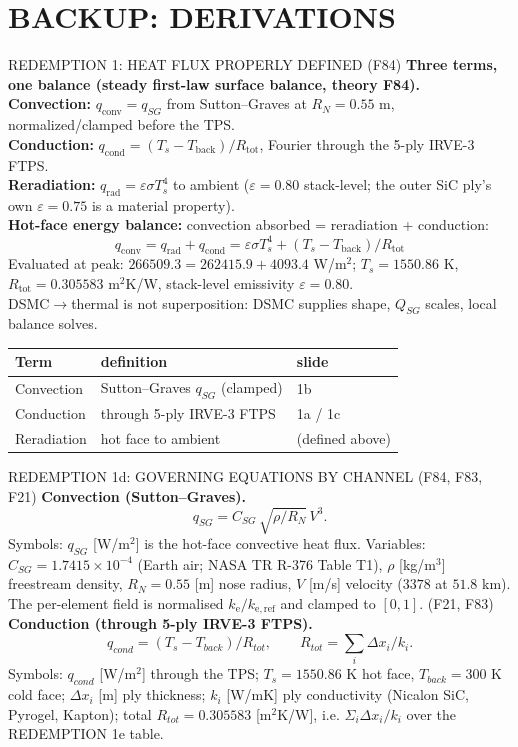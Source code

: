 \documentclass[aspectratio=169,11pt]{beamer}
\begin{document}
\section{BACKUP: DERIVATIONS}
\begin{frame}{REDEMPTION 1: HEAT FLUX PROPERLY DEFINED (F84)}
  \small
  \textbf{Three terms, one balance (steady first-law surface balance, theory F84).}\\
  \textbf{Convection:} $q_{\mathrm{conv}}=q_{SG}$ from Sutton--Graves at $R_N=0.55$ m,
  normalized/clamped before the TPS.\\
  \textbf{Conduction:} $q_{\mathrm{cond}}=(T_s-T_{\mathrm{back}})/R_{\mathrm{tot}}$,
  Fourier through the 5-ply IRVE-3 FTPS.\\
  \textbf{Reradiation:} $q_{\mathrm{rad}}=\varepsilon\sigma T_s^4$ to ambient
  ($\varepsilon=0.80$ stack-level; the outer SiC ply's own $\varepsilon=0.75$
  is a material property).\\
  \textbf{Hot-face energy balance:} convection absorbed = reradiation + conduction:
  \[
  q_{\mathrm{conv}} = q_{\mathrm{rad}} + q_{\mathrm{cond}}
  = \varepsilon\sigma T_s^4 + (T_s - T_{\mathrm{back}})/R_{\mathrm{tot}}
  \]
  Evaluated at peak: $266509.3 = 262415.9 + 4093.4$ W/m$^2$;
  $T_s=1550.86$ K, $R_{\mathrm{tot}}=0.305583$ m$^2$K/W,
  stack-level emissivity $\varepsilon=0.80$.\\
  DSMC$\rightarrow$thermal is not superposition: DSMC supplies shape, $Q_{SG}$ scales, local balance solves.\\
  \begin{tabular}{@{}lll@{}}
  \textbf{Term} & \textbf{definition} & \textbf{slide}\\
  \hline
  Convection & Sutton--Graves $q_{SG}$ (clamped) & 1b\\
  Conduction & through 5-ply IRVE-3 FTPS & 1a / 1c\\
  Reradiation & hot face to ambient & (defined above)\\
  \end{tabular}
\end{frame}
\begin{frame}{REDEMPTION 1d: GOVERNING EQUATIONS BY CHANNEL (F84, F83, F21)}
  \small
  \textbf{Convection (Sutton--Graves).}
  \[
    q_{SG}=C_{SG}\,\sqrt{\rho/R_N}\,V^3.
  \]
  Symbols: $q_{SG}$ [W/m$^2$] is the hot-face convective heat flux.
  Variables: $C_{SG}=1.7415\times 10^{-4}$ (Earth air; NASA TR R-376 Table T1),
  $\rho$ [kg/m$^3$] freestream density, $R_N=0.55$ [m] nose radius,
  $V$ [m/s] velocity ($3378$ at $51.8$ km). The per-element field is normalised
  $k_{\mathrm{e}}/k_{\mathrm{e,ref}}$ and clamped to $[0,1]$. (F21, F83) \\

  \textbf{Conduction (through 5-ply IRVE-3 FTPS).}
  \[
    q_{cond}=(T_s-T_{back})/R_{tot},\qquad
    R_{tot}=\sum_i \Delta x_i/k_i.
  \]
  Symbols: $q_{cond}$ [W/m$^2$] through the TPS; $T_s=1550.86$ K hot face,
  $T_{back}=300$ K cold face; $\Delta x_i$ [m] ply thickness; $k_i$ [W/mK]
  ply conductivity (Nicalon SiC, Pyrogel, Kapton); total
  $R_{tot}=0.305583$ [m$^2$K/W], i.e. $\Sigma_i\Delta x_i/k_i$ over the
  REDEMPTION 1e table.
\end{frame}
\end{document}
